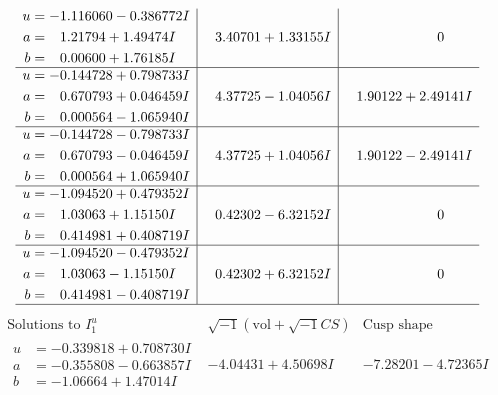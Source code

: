 \documentclass[1p]{elsarticle_modified}
\theoremstyle{definition}
\newcommand{\I}{\sqrt{-1}}
\begin{document}
$$\begin{array}{c|c|c}
\begin{aligned}
u &= -1.116060 - 0.386772 I \\
a &= \phantom{-}1.21794 + 1.49474 I \\
b &= \phantom{-}0.00600 + 1.76185 I\end{aligned}
 & \phantom{-}3.40701 + 1.33155 I & \phantom{-0.000000 } 0 \\ \hline\begin{aligned}
u &= -0.144728 + 0.798733 I \\
a &= \phantom{-}0.670793 + 0.046459 I \\
b &= \phantom{-}0.000564 - 1.065940 I\end{aligned}
 & \phantom{-}4.37725 - 1.04056 I & \phantom{-}1.90122 + 2.49141 I \\ \hline\begin{aligned}
u &= -0.144728 - 0.798733 I \\
a &= \phantom{-}0.670793 - 0.046459 I \\
b &= \phantom{-}0.000564 + 1.065940 I\end{aligned}
 & \phantom{-}4.37725 + 1.04056 I & \phantom{-}1.90122 - 2.49141 I \\ \hline\begin{aligned}
u &= -1.094520 + 0.479352 I \\
a &= \phantom{-}1.03063 + 1.15150 I \\
b &= \phantom{-}0.414981 + 0.408719 I\end{aligned}
 & \phantom{-}0.42302 - 6.32152 I & \phantom{-0.000000 } 0 \\ \hline\begin{aligned}
u &= -1.094520 - 0.479352 I \\
a &= \phantom{-}1.03063 - 1.15150 I \\
b &= \phantom{-}0.414981 - 0.408719 I\end{aligned}
 & \phantom{-}0.42302 + 6.32152 I & \phantom{-0.000000 } 0\\
 \hline 
 \end{array}$$\newpage$$\begin{array}{c|c|c}  
\text{Solutions to }I^u_{1}& \I (\text{vol} + \sqrt{-1}CS) & \text{Cusp shape}\\
 \hline 
\begin{aligned}
u &= -0.339818 + 0.708730 I \\
a &= -0.355808 - 0.663857 I \\
b &= -1.06664 + 1.47014 I\end{aligned}
 & -4.04431 + 4.50698 I & -7.28201 - 4.72365 I \\ \hline\begin{aligned}

\end{aligned}
\end{array}$$
\end{document}
